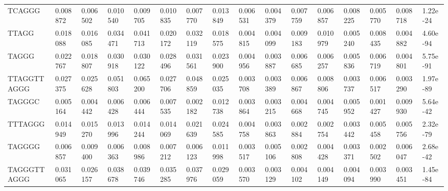 \begin{samepage}
\begin{table}[h!]
\begin{tabular}{llllllllllllllll}
TCAGGG          & 0.008872       & 0.006502       & 0.010540       & 0.009705       & 0.010835       & 0.007770       & 0.013849       & 0.006531       & 0.004379       & 0.007759       & 0.006857       & 0.008225       & 0.005770       & 0.008718       & 1.22e-24                           \\
TTAGG           & 0.018088       & 0.016085       & 0.034471       & 0.041713       & 0.020172       & 0.032119       & 0.018575       & 0.004815       & 0.004099       & 0.009183       & 0.010979       & 0.005240       & 0.008435       & 0.004882       & 4.60e-94                           \\
TAGGG           & 0.022767       & 0.018807       & 0.030918       & 0.030122       & 0.028496       & 0.031561       & 0.023900       & 0.004956       & 0.003887       & 0.006685       & 0.006257       & 0.005836       & 0.006719       & 0.004801       & 5.75e-91                           \\
TTAGGTTAGGG     & 0.027375       & 0.025628       & 0.051803       & 0.065200       & 0.027706       & 0.048859       & 0.025035       & 0.003708       & 0.003389       & 0.006867       & 0.008806       & 0.003737       & 0.006517       & 0.003290       & 1.97e-89                           \\
TAGGGC          & 0.005164       & 0.004442       & 0.006428       & 0.006444       & 0.007535       & 0.002182       & 0.012738       & 0.003864       & 0.003215       & 0.004668       & 0.004745       & 0.005952       & 0.001427       & 0.009930       & 5.64e-42                           \\
TTTAGGG         & 0.014949       & 0.015270       & 0.013996       & 0.014244       & 0.014069       & 0.021639       & 0.024585       & 0.004758       & 0.003863       & 0.002884       & 0.002754       & 0.003442       & 0.005458       & 0.005756       & 2.32e-79                           \\
TAGGGG          & 0.006857       & 0.009400       & 0.006363       & 0.008986       & 0.007212       & 0.006123       & 0.011998       & 0.003517       & 0.005106       & 0.002808       & 0.004428       & 0.003371       & 0.002502       & 0.006047       & 2.68e-42                           \\
TAGGGTTAGGG     & 0.031065       & 0.026157       & 0.038678       & 0.039746       & 0.035285       & 0.037976       & 0.029059       & 0.003570       & 0.003129       & 0.004102       & 0.004149       & 0.004094       & 0.003990       & 0.003451       & 1.45e-84                           \\

\end{tabular}
\end{table}
\end{samepage}
